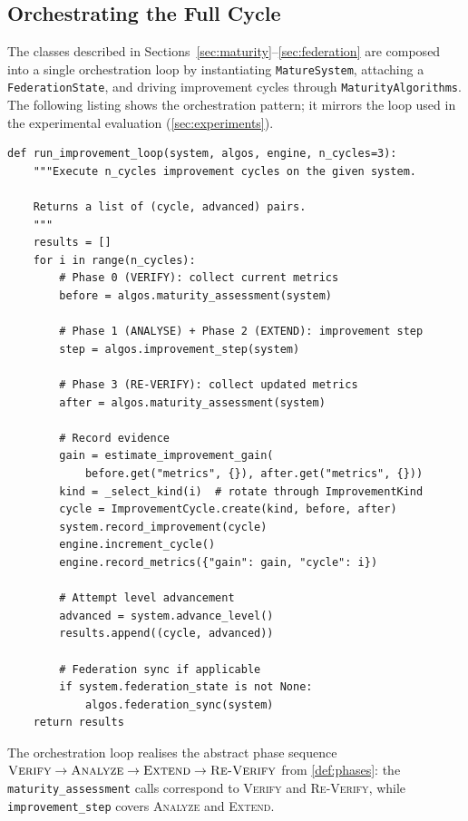 \documentclass[11pt]{article}
\newcommand{\Verify}{\textsc{Verify}}
\newcommand{\Analyze}{\textsc{Analyze}}
\newcommand{\Extend}{\textsc{Extend}}
\newcommand{\ReVerify}{\textsc{Re-Verify}}
\begin{document}
\subsection{Orchestrating the Full Cycle}

The classes described in Sections~\ref{sec:maturity}--\ref{sec:federation}
are composed into a single orchestration loop by instantiating
\texttt{MatureSystem}, attaching a \texttt{FederationState}, and driving
improvement cycles through \texttt{MaturityAlgorithms}.  The following
listing shows the orchestration pattern; it mirrors the loop used in the
experimental evaluation (\cref{sec:experiments}).

\begin{lstlisting}[style=jugeo-python,
  caption={Orchestration loop composing all subsystems.}]
def run_improvement_loop(system, algos, engine, n_cycles=3):
    """Execute n_cycles improvement cycles on the given system.

    Returns a list of (cycle, advanced) pairs.
    """
    results = []
    for i in range(n_cycles):
        # Phase 0 (VERIFY): collect current metrics
        before = algos.maturity_assessment(system)

        # Phase 1 (ANALYSE) + Phase 2 (EXTEND): improvement step
        step = algos.improvement_step(system)

        # Phase 3 (RE-VERIFY): collect updated metrics
        after = algos.maturity_assessment(system)

        # Record evidence
        gain = estimate_improvement_gain(
            before.get("metrics", {}), after.get("metrics", {}))
        kind = _select_kind(i)  # rotate through ImprovementKind
        cycle = ImprovementCycle.create(kind, before, after)
        system.record_improvement(cycle)
        engine.increment_cycle()
        engine.record_metrics({"gain": gain, "cycle": i})

        # Attempt level advancement
        advanced = system.advance_level()
        results.append((cycle, advanced))

        # Federation sync if applicable
        if system.federation_state is not None:
            algos.federation_sync(system)
    return results
\end{lstlisting}

The orchestration loop realises the abstract phase sequence
$\Verify \to \Analyze \to \Extend \to \ReVerify$ from \cref{def:phases}:
the \texttt{maturity\_assessment} calls correspond to \Verify{} and
\ReVerify{}, while \texttt{improvement\_step} covers \Analyze{} and
\Extend{}.
\end{document}
